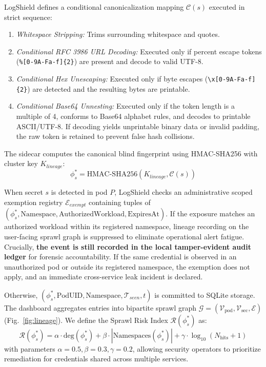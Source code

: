 \documentclass[conference]{IEEEtran}
\begin{document}
LogShield defines a conditional canonicalization mapping $\mathcal{C}(s)$ executed in strict sequence:
\begin{enumerate}
    \item \textit{Whitespace Stripping:} Trims surrounding whitespace and quotes.
    \item \textit{Conditional RFC 3986 URL Decoding:} Executed only if percent escape tokens (\texttt{\%[0-9A-Fa-f]\{2\}}) are present and decode to valid UTF-8.
    \item \textit{Conditional Hex Unescaping:} Executed only if byte escapes (\texttt{\textbackslash x[0-9A-Fa-f]\{2\}}) are detected and the resulting bytes are printable.
    \item \textit{Conditional Base64 Unnesting:} Executed only if the token length is a multiple of 4, conforms to Base64 alphabet rules, and decodes to printable ASCII/UTF-8. If decoding yields unprintable binary data or invalid padding, the raw token is retained to prevent false hash collisions.
\end{enumerate}

The sidecar computes the canonical blind fingerprint using HMAC-SHA256 with cluster key $K_{lineage}$:
\begin{equation}
    \phi_s^* = \text{HMAC-SHA256}(K_{lineage}, \mathcal{C}(s))
\end{equation}

When secret $s$ is detected in pod $P$, LogShield checks an administrative scoped exemption registry $\mathcal{E}_{exempt}$ containing tuples of $(\phi_s^*, \text{Namespace}, \text{AuthorizedWorkload}, \text{ExpiresAt})$. If the exposure matches an authorized workload within its registered namespace, lineage recording on the user-facing sprawl graph is suppressed to eliminate operational alert fatigue. Crucially, \textbf{the event is still recorded in the local tamper-evident audit ledger} for forensic accountability. If the same credential is observed in an unauthorized pod or outside its registered namespace, the exemption does not apply, and an immediate cross-service leak incident is declared.

Otherwise, $(\phi_s^*, \text{PodUID}, \text{Namespace}, \mathcal{T}_{seen}, t)$ is committed to SQLite storage. The dashboard aggregates entries into bipartite sprawl graph $\mathcal{G} = (\mathcal{V}_{\text{pod}}, \mathcal{V}_{\text{sec}}, \mathcal{E})$ (Fig.~\ref{fig:lineage}). We define the Sprawl Risk Index $\mathcal{R}(\phi_s^*)$ as:
\begin{equation}
    \mathcal{R}(\phi_s^*) = \alpha \cdot \text{deg}(\phi_s^*) + \beta \cdot |\text{Namespaces}(\phi_s^*)| + \gamma \cdot \log_{10}(N_{\text{hits}} + 1)
\end{equation}
with parameters $\alpha=0.5, \beta=0.3, \gamma=0.2$, allowing security operators to prioritize remediation for credentials shared across multiple services.
\end{document}
